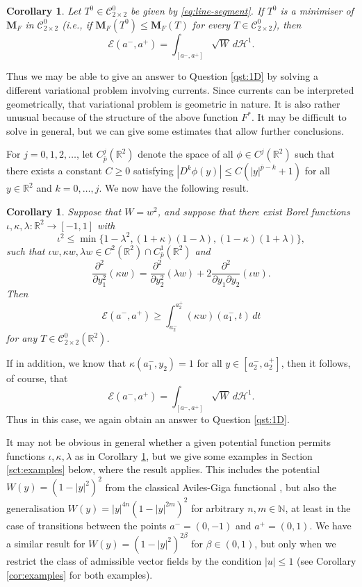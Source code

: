 \documentclass[a4paper]{article}
\newcommand{\R}{\mathbb{R}}
\newcommand{\N}{\mathbb{N}}
\newcommand{\Ha}{\mathcal{H}}
\newcommand{\M}{\mathbf{M}}
\newcommand{\ncrt}{\mathcal{C}}
\newtheorem{corollary}[theorem]{Corollary}
\theoremstyle{definition}
\theoremstyle{remark}
\begin{document}
\begin{corollary} \label{cor:1D}
Let $T^0 \in \ncrt_{2 \times 2}^0$ be given by \eqref{eq:line-segment}.
If $T^0$ is a minimiser of $\M_F$ in $\ncrt_{2 \times 2}^0$
(i.e., if $\M_F(T^0) \le \M_F(T)$ for every $T \in \ncrt_{2 \times 2}^0$), then
\[
\mathcal{E}(a^-, a^+) = \int_{[a^-, a^+]} \sqrt{W} \, d\Ha^1.
\]
\end{corollary}

Thus we may be able to give an answer to Question \ref{qst:1D} by
solving a different variational problem involving currents. Since currents
can be interpreted geometrically, that variational problem is geometric in nature.
It is also rather unusual because of the structure of the above function $F^*$.
It may be difficult to solve in general, but we can give some estimates that
allow further conclusions.

For $j = 0, 1, 2, \dotsc$, let $C_{\bar{p}}^j(\R^2)$ denote the space of all $\phi \in C^j(\R^2)$ such
that there exists a constant $C \ge 0$ satisfying $|D^k\phi(y)| \le C(|y|^{\bar{p} - k} + 1)$ for
all $y \in \R^2$ and $k = 0, \dotsc, j$. We now have the following result.

\begin{corollary} \label{cor:PDE}
Suppose that $W = w^2$, and suppose that there exist Borel functions
$\iota, \kappa, \lambda \colon \R^2 \to [-1, 1]$ with
\[
\iota^2 \le \min\{1 - \lambda^2, (1 + \kappa)(1 - \lambda), (1 - \kappa)(1 + \lambda)\},
\]
such that $\iota w, \kappa w, \lambda w \in C^2(\R^2) \cap C_{\bar{p}}^1(\R^2)$ and
\begin{equation} \label{eq:PDE-criterion}
\frac{\partial^2}{\partial y_1^2}(\kappa w) = \frac{\partial^2}{\partial y_2^2}(\lambda w) + 2\frac{\partial^2}{\partial y_1 \partial y_2}(\iota w).
\end{equation}
Then
\[
\mathcal{E}(a^-, a^+) \ge \int_{a_2^-}^{a_2^+} (\kappa w)(a_1^-, t) \, dt
\]
for any $T \in \ncrt_{2 \times 2}^0(\R^2)$.
\end{corollary}

If in addition, we know that $\kappa(a_1^-, y_2) = 1$ for all $y \in [a_2^-, a_2^+]$, then
it follows, of course, that
\[
\mathcal{E}(a^-, a^+) = \int_{[a^-, a^+]} \sqrt{W} \, d\Ha^1.
\]
Thus in this case, we again obtain an answer to Question \ref{qst:1D}.

It may not be obvious in general whether a given potential function
permits functions $\iota, \kappa, \lambda$ as in Corollary \ref{cor:PDE},
but we give some examples in Section \ref{sct:examples} below, where the
result applies. This includes the potential $W(y) = (1 - |y|^2)^2$
from the classical Aviles-Giga functional \cite{Aviles-Giga:87}, but also
the generalisation $W(y) = |y|^{4n} (1 - |y|^{2m})^2$ for arbitrary $n, m \in \N$,
at least in the case of transitions between the points $a^- = (0, -1)$
and $a^+ = (0, 1)$. We have a similar result for $W(y) = (1 - |y|^2)^{2\beta}$ for $\beta \in (0, 1)$, but only when we restrict the class of admissible
vector fields by the condition
$|u| \le 1$ (see Corollary \ref{cor:examples} for both examples).
\end{document}
